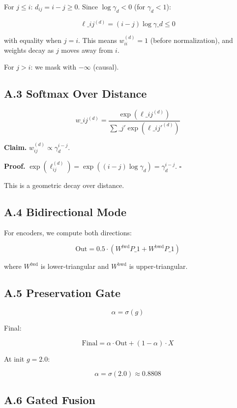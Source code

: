 For $j \leq i$: $d_{ij} = i - j \geq 0$. Since $\log \gamma_d < 0$ 
(for $\gamma_d < 1$):

\[
\ell\_{ij}^{(d)} = (i - j) \log \gamma\_d \leq 0
\tag{A.4}
\]

with equality when $j = i$. This means $w_{ii}^{(d)} = 1$ (before 
normalization), and weights decay as $j$ moves away from $i$.

For $j > i$: we mask with $-\infty$ (causal).

\subsection{A.3 Softmax Over Distance}

\[
w\_{ij}^{(d)} = \frac{\exp(\ell\_{ij}^{(d)})}{\sum\_{j'} \exp(\ell\_{ij'}^{(d)})}
\tag{A.5}
\]

\textbf{Claim.} $w_{ij}^{(d)} \propto \gamma_d^{i - j}$.

\textbf{Proof.} $\exp(\ell_{ij}^{(d)}) = \exp((i-j) \log \gamma_d) = \gamma_d^{i-j}$. 
$\square$

This is a geometric decay over distance.

\subsection{A.4 Bidirectional Mode}

For encoders, we compute both directions:

\[
\text{Out} = 0.5 \cdot (W^\text{fwd} P\_1 + W^\text{bwd} P\_1)
\tag{A.6}
\]

where $W^\text{fwd}$ is lower-triangular and $W^\text{bwd}$ is upper-triangular.

\subsection{A.5 Preservation Gate}

\[
\alpha = \sigma(g)
\tag{A.7}
\]

Final:

\[
\text{Final} = \alpha \cdot \text{Out} + (1 - \alpha) \cdot X
\tag{A.8}
\]

At init $g = 2.0$:

\[
\alpha = \sigma(2.0) \approx 0.8808
\tag{A.9}
\]

\subsection{A.6 Gated Fusion}

